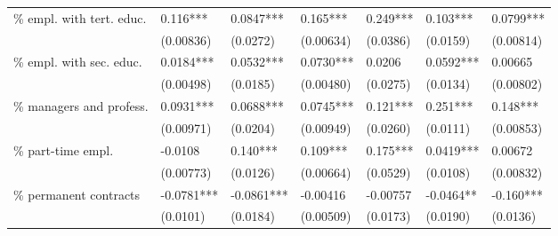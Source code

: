 \documentclass[Review,times,sageh,11pt]{sagej}
\begin{document}
\begin{table}[hbt]
{\begin{threeparttable}
\begin{tabular}{l*{6}{l}}
\% empl. with tert. educ.                   &       0.116***    & 0.0847***   & 0.165***   & 0.249***    & 0.103***   & 0.0799***    \\
                                            &       (0.00836)   & (0.0272)    & (0.00634)  & (0.0386)    & (0.0159)   & (0.00814)    \\[1ex]
\% empl. with sec. educ.                    &       0.0184***   & 0.0532***   & 0.0730***  & 0.0206      & 0.0592***  & 0.00665      \\
                                            &       (0.00498)   & (0.0185)    & (0.00480)  & (0.0275)    & (0.0134)   & (0.00802)    \\[1ex]
\% managers and profess.                    &       0.0931***   & 0.0688***   & 0.0745***  & 0.121***    & 0.251***   & 0.148***     \\
                                            &       (0.00971)   & (0.0204)    & (0.00949)  & (0.0260)    & (0.0111)   & (0.00853)    \\[1ex]
\% part-time empl.                          &       -0.0108     & 0.140***    & 0.109***   & 0.175***    & 0.0419***  & 0.00672      \\
                                            &       (0.00773)   & (0.0126)    & (0.00664)  & (0.0529)    & (0.0108)   & (0.00832)    \\[1ex]
\% permanent contracts                      &       -0.0781***  & -0.0861***  & -0.00416   & -0.00757    & -0.0464**  & -0.160***    \\
                                            &       (0.0101)    & (0.0184)    & (0.00509)  & (0.0173)    & (0.0190)   & (0.0136)     \\[1ex]


\end{tabular}
\end{threeparttable}}
\end{table}
\end{document}
